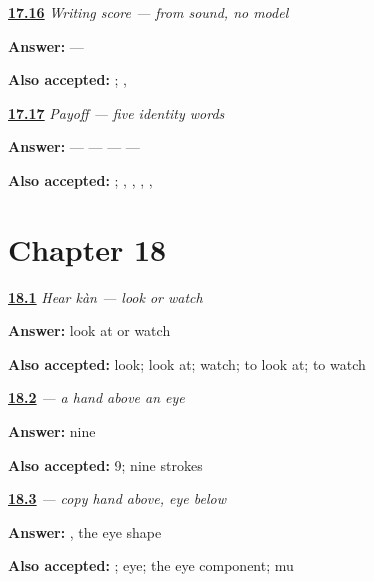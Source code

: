 \noindent\begin{minipage}[t]{\linewidth}
\raggedright
\hyperlink{review-ZH-R17-writing-five-pair}{\textbf{17.16}} \emph{Writing score — from sound, no model}\par
\small \textbf{Answer:}  — \par
\footnotesize \textbf{Also accepted:}  ; , 
\end{minipage}\par\medskip

\noindent\begin{minipage}[t]{\linewidth}
\raggedright
\hyperlink{review-ZH-C17-practice-pass}{\textbf{17.17}} \emph{Payoff — five identity words}\par
\small \textbf{Answer:}  —  —  —  — \par
\footnotesize \textbf{Also accepted:}     ; , , , , 
\end{minipage}\par\medskip

\section*{Chapter 18}

\noindent\begin{minipage}[t]{\linewidth}
\raggedright
\hyperlink{review-ZH-C18-hear-kan-meaning}{\textbf{18.1}} \emph{Hear \emph{kàn} — look or watch}\par
\small \textbf{Answer:} look at or watch\par
\footnotesize \textbf{Also accepted:} look; look at; watch; to look at; to watch
\end{minipage}\par\medskip

\noindent\begin{minipage}[t]{\linewidth}
\raggedright
\hyperlink{review-ZH-W18-kan-observe-count}{\textbf{18.2}} \emph{ — a hand above an eye}\par
\small \textbf{Answer:} nine\par
\footnotesize \textbf{Also accepted:} 9; nine strokes
\end{minipage}\par\medskip

\noindent\begin{minipage}[t]{\linewidth}
\raggedright
\hyperlink{review-ZH-W18-kan-guided-parts}{\textbf{18.3}} \emph{ — copy hand above, eye below}\par
\small \textbf{Answer:} , the eye shape\par
\footnotesize \textbf{Also accepted:} ; eye; the eye component; mu
\end{minipage}\par\medskip

